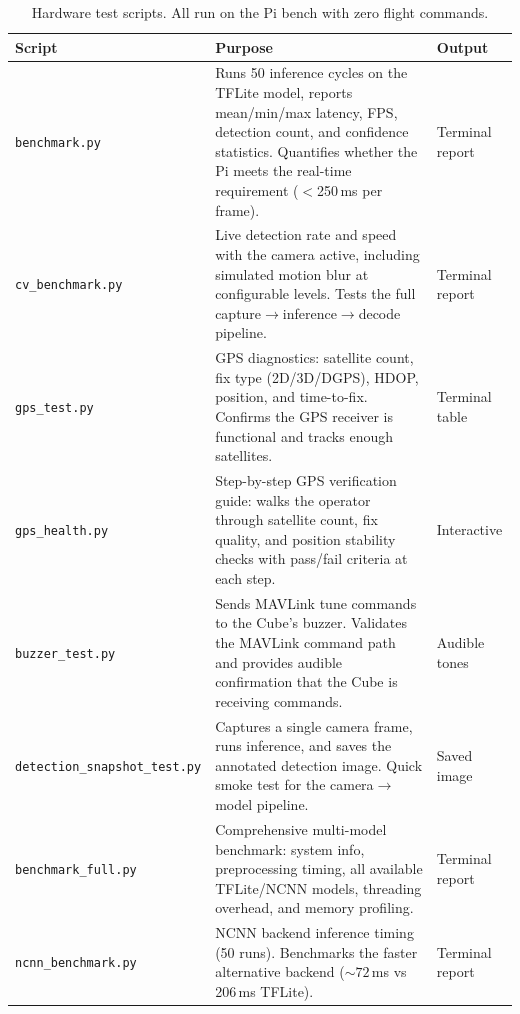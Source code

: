 \begin{table}[H]
\centering
\caption{Hardware test scripts.  All run on the Pi bench with zero flight commands.}
\label{tab:hw-tests}
\small
\begin{tabular}{@{}lp{7.5cm}l@{}}
\toprule
\textbf{Script} & \textbf{Purpose} & \textbf{Output} \\
\midrule
\texttt{benchmark.py} & Runs 50 inference cycles on the TFLite model, reports mean/min/max latency, FPS, detection count, and confidence statistics.  Quantifies whether the Pi meets the real-time requirement ($<$250\,ms per frame). & Terminal report \\
\addlinespace
\texttt{cv\_benchmark.py} & Live detection rate and speed with the camera active, including simulated motion blur at configurable levels.  Tests the full capture$\to$inference$\to$decode pipeline. & Terminal report \\
\addlinespace
\texttt{gps\_test.py} & GPS diagnostics: satellite count, fix type (2D/3D/DGPS), HDOP, position, and time-to-fix.  Confirms the GPS receiver is functional and tracks enough satellites. & Terminal table \\
\addlinespace
\texttt{gps\_health.py} & Step-by-step GPS verification guide: walks the operator through satellite count, fix quality, and position stability checks with pass/fail criteria at each step. & Interactive \\
\addlinespace
\texttt{buzzer\_test.py} & Sends MAVLink tune commands to the Cube's buzzer.  Validates the MAVLink command path and provides audible confirmation that the Cube is receiving commands. & Audible tones \\
\addlinespace
\texttt{detection\_snapshot\_test.py} & Captures a single camera frame, runs inference, and saves the annotated detection image.  Quick smoke test for the camera$\to$model pipeline. & Saved image \\
\addlinespace
\texttt{benchmark\_full.py} & Comprehensive multi-model benchmark: system info, preprocessing timing, all available TFLite/NCNN models, threading overhead, and memory profiling. & Terminal report \\
\addlinespace
\texttt{ncnn\_benchmark.py} & NCNN backend inference timing (50 runs).  Benchmarks the faster alternative backend (${\sim}72$\,ms vs 206\,ms TFLite). & Terminal report \\
\bottomrule
\end{tabular}
\end{table}

